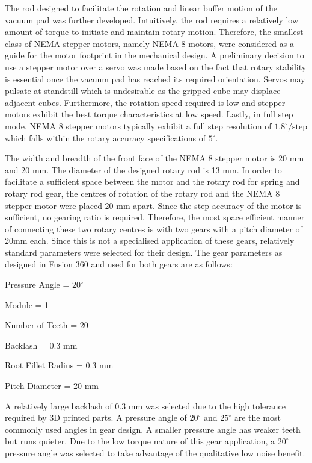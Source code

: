 
The rod designed to facilitate the rotation and linear buffer motion of the vacuum pad was further developed. Intuitively, the rod requires a relatively low amount of torque to initiate and maintain rotary motion. Therefore, the smallest class of NEMA stepper motors, namely NEMA 8 motors, were considered as a guide for the motor footprint in the mechanical design. A preliminary decision to use a stepper motor over a servo was made based on the fact that rotary stability is essential once the vacuum pad has reached its required orientation. Servos may pulsate at standstill which is undesirable as the gripped cube may displace adjacent cubes. Furthermore, the rotation speed required is low and stepper motors exhibit the best torque characteristics at low speed. Lastly, in full step mode, NEMA 8 stepper motors typically exhibit a full step resolution of $1.8 ^\circ / \text{step}$ which falls within the rotary accuracy specifications of $5 ^\circ$.


The width and breadth of the front face of the NEMA 8 stepper motor is 20 mm and 20 mm. The diameter of the designed rotary rod is 13 mm. In order to facilitate a sufficient space between the motor and the rotary rod for spring and rotary rod gear, the centres of rotation of the rotary rod and the NEMA 8 stepper motor were placed 20 mm apart. Since the step accuracy of the motor is sufficient, no gearing ratio is required. Therefore, the most space efficient manner of connecting these two rotary centres is with two gears with a pitch diameter of 20mm each. Since this is not a specialised application of these gears, relatively standard parameters were selected for their design. The gear parameters as designed in Fusion 360 and used for both gears are as follows:

\begin{compactitem}
	\item Pressure Angle = $20 ^\circ$
	\item Module = 1
	\item Number of Teeth = 20
	\item Backlash = 0.3 mm
	\item Root Fillet Radius = 0.3 mm
	\item Pitch Diameter = 20 mm
\end{compactitem}

A relatively large backlash of 0.3 mm was selected due to the high tolerance required by 3D printed parts. A pressure angle of $20 ^\circ$ and $25 ^\circ$ are the most commonly used angles in gear design. A smaller pressure angle has weaker teeth but runs quieter. Due to the low torque nature of this gear application, a $20 ^\circ$ pressure angle was selected to take advantage of the qualitative low noise benefit.

